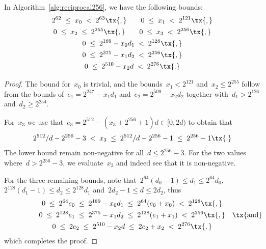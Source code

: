 \documentclass[12pt,oneside,draft]{scrartcl}
\begin{document}
\begin{corollary}
\label{corr:variable256_bounds}
In Algorithm~\ref{alg:reciprocal256}, we have the following bounds:
\begin{gather*}
  2^{62}
\;\le\;
  x_{0}
\;<\;
  2^{63}
\tx{,}\qquad
  0
\;\le\;
  x_{1}
\;<\;
  2^{121}
\tx{,}
\\
  0
\;\le\;
  x_{2}
\;\le\;
  2^{255}
\tx{,}\qquad
  0
\;\le\;
  x_{3}
\;<\;
  2^{256}
\tx{,}
\\
  0
\;\le\;
  2^{189} - x_{0} d_{1}
\;<\;
  2^{128}
\tx{,}
\\
  0
\;\le\;
  2^{375} - x_{1} d_{2}
\;<\;
  2^{256}
\tx{,}
\\
  0
\;\le\;
  2^{510} - x_{2} d
\;<\;
  2^{276}
\tx{.}
\end{gather*}
\end{corollary}
\begin{proof}
The bound for~$x_{0}$ is trivial, and the bounds~$x_{1} < 2^{121}$ and~$x_{2} \le 2^{255}$ follow from the bounds of~$e_{1} = 2^{247} - x_{1} d_{1}$ and~$e_{2} = 2^{509} - x_{2} d_{2}$ together with~$d_{1} > 2^{126}$ and~$d_{2} \ge 2^{254}$.

For~$x_{3}$ we use that~$e_{3} = 2^{512} - (x_{3} + 2^{256} + 1) d \in [0, 2 d)$ to obtain that
\begin{gather*}
  2^{512} / d - 2^{256} - 3
\;<\;
  x_{3}
\;\le\;
  2^{512} / d - 2^{256} - 1
\;\le\;
  2^{256} - 1
\tx{.}
\end{gather*}
The lower bound remain non-negative for all~$d \le 2^{256} - 3$.  For the two values where~$d > 2^{256} - 3$, we evaluate~$x_{3}$ and indeed see that it is non-negative.

For the three remaining bounds, note that~$2^{64} (d_{0} - 1) \le d_{1} \le 2^{64} d_{0}$, $2^{128} (d_{1} - 1) \le d_{2} \le 2^{128} d_{1}$ and~$2 d_{2} - 1 \le d \le 2 d_{2}$, thus
\begin{gather*}
  0
\;\le\;
  2^{64} e_{0}
\;\le\;
  2^{189} - x_{0} d_{1}
\;\le\;
  2^{64} (e_{0} + x_{0})
\;<\;
  2^{128}
\tx{,}
\\
  0
\;\le\;
  2^{128} e_{1}
\;\le\;
  2^{375} - x_{1} d_{2}
\;\le\;
  2^{128} (e_{1} + x_{1})
\;<\;
  2^{256}
\tx{,}\makebox[0pt][l]{\quad\tx{and}}
\\
  0
\;\le\;
  2 e_{2}
\;\le\;
  2^{510} - x_{2} d
\;\le\;
  2 e_{2} + x_{2}
\;<\;
  2^{276}
\tx{,}
\end{gather*}
which completes the proof.
\end{proof}

\end{document}
